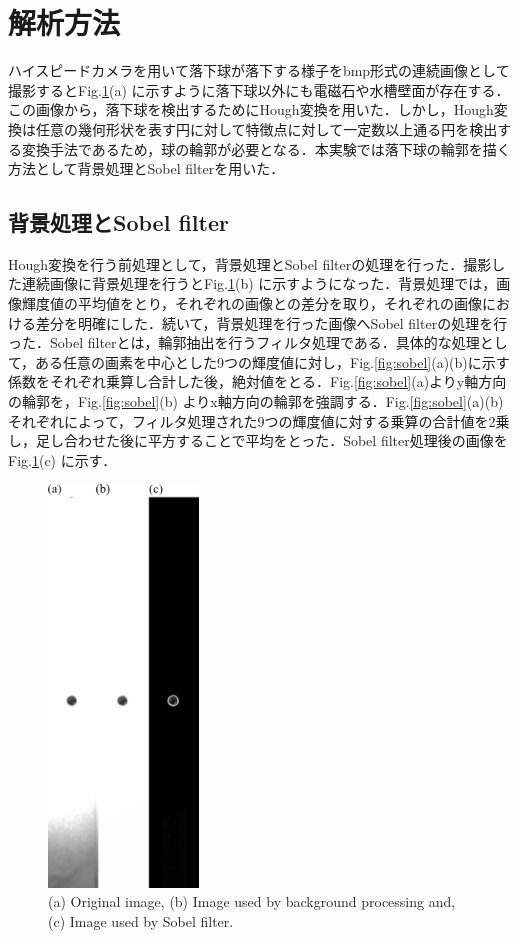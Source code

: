 \section{解析方法}
ハイスピードカメラを用いて落下球が落下する様子をbmp形式の連続画像として撮影するとFig.\ref{fig:expPhoto}(a) に示すように落下球以外にも電磁石や水槽壁面が存在する．この画像から，落下球を検出するためにHough変換を用いた．しかし，Hough変換は任意の幾何形状を表す円に対して特徴点に対して一定数以上通る円を検出する変換手法であるため，球の輪郭が必要となる．本実験では落下球の輪郭を描く方法として背景処理とSobel filterを用いた．
\subsection{背景処理とSobel filter}
Hough変換を行う前処理として，背景処理とSobel filterの処理を行った．撮影した連続画像に背景処理を行うとFig.\ref{fig:expPhoto}(b) に示すようになった．背景処理では，画像輝度値の平均値をとり，それぞれの画像との差分を取り，それぞれの画像における差分を明確にした．続いて，背景処理を行った画像へSobel filterの処理を行った．Sobel filterとは，輪郭抽出を行うフィルタ処理である．具体的な処理として，ある任意の画素を中心とした9つの輝度値に対し，Fig.\ref{fig:sobel}(a)(b)に示す係数をそれぞれ乗算し合計した後，絶対値をとる．Fig.\ref{fig:sobel}(a)よりy軸方向の輪郭を，Fig.\ref{fig:sobel}(b) よりx軸方向の輪郭を強調する．Fig.\ref{fig:sobel}(a)(b)それぞれによって，フィルタ処理された9つの輝度値に対する乗算の合計値を2乗し，足し合わせた後に平方することで平均をとった．Sobel filter処理後の画像をFig.\ref{fig:expPhoto}(c) に示す．

\begin{figure}[h]
    \centering
    \includegraphics[width=4.0cm,clip]{3-Analysis/exp-img.png}
    \caption{(a) Original image, (b) Image used by background processing and, (c) Image used by Sobel filter.}
    \label{fig:expPhoto}
\end{figure}

